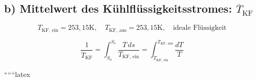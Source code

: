 \subsection*{b) Mittelwert des Kühlflüssigkeitsstromes: $\overline{T}_{\text{KF}}$}

\[
T_{\text{KF, ein}} = 253,15 \text{K}, \quad T_{\text{KF, aus}} = 253,15 \text{K}, \quad \text{ideale Flüssigkeit}
\]

\[
\frac{1}{\overline{T}_{\text{KF}}} = \int_{S_a}^{S_e} \frac{T \, ds}{T_{\text{KF, ein}}} = \int_{T_{\text{KF, ein}}}^{T_{\text{KF, aus}}} \frac{dT}{T}
\]

``````latex